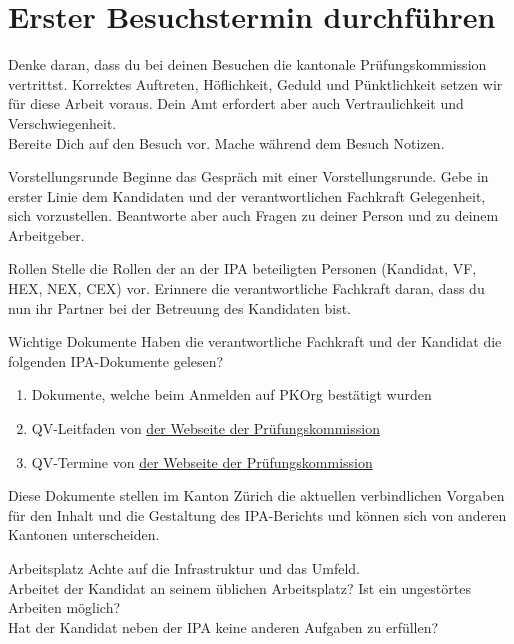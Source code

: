 \section{Erster Besuchstermin durchführen}
Denke daran, dass du bei deinen Besuchen die kantonale Prüfungskommission vertrittst. Korrektes Auftreten, Höflichkeit, Geduld und Pünktlichkeit setzen wir für diese Arbeit voraus. Dein Amt erfordert aber auch Vertraulichkeit und Verschwiegenheit.\\Bereite Dich auf den Besuch vor. Mache während dem Besuch Notizen.

\begin{taskitem}{Vorstellungsrunde}
  Beginne das Gespräch mit einer Vorstellungsrunde. Gebe in erster Linie dem Kandidaten und der verantwortlichen Fachkraft Gelegenheit, sich vorzustellen. Beantworte aber auch Fragen zu deiner Person und zu deinem Arbeitgeber.
\end{taskitem}
\begin{taskitem}{Rollen}
  Stelle die Rollen der an der IPA beteiligten Personen (Kandidat, VF, HEX, NEX, CEX) vor. Erinnere die verantwortliche Fachkraft daran, dass du nun ihr Partner bei der Betreuung des Kandidaten bist.
\end{taskitem}
\begin{taskitemwithoutcomment}{Wichtige Dokumente}
  Haben die verantwortliche Fachkraft und der Kandidat die folgenden IPA-Dokumente gelesen?
  \begin{enumerate}
    \item Dokumente, welche beim Anmelden auf PKOrg bestätigt wurden
    \item QV-Leitfaden von \href{https://pk19.ch}{der Webseite der Prüfungskommission}
    \item QV-Termine von \href{https://pk19.ch}{der Webseite der Prüfungskommission}
  \end{enumerate}
  Diese Dokumente stellen im Kanton Zürich die aktuellen verbindlichen Vorgaben für den Inhalt und die Gestaltung des IPA-Berichts und können sich von anderen Kantonen unterscheiden.
\end{taskitemwithoutcomment}
\newpage
\begin{taskitem}{Arbeitsplatz}
  Achte auf die Infrastruktur und das Umfeld.\\Arbeitet der Kandidat an seinem üblichen Arbeitsplatz? Ist ein ungestörtes Arbeiten möglich?\\Hat der Kandidat neben der IPA keine anderen Aufgaben zu erfüllen?
\end{taskitem}
